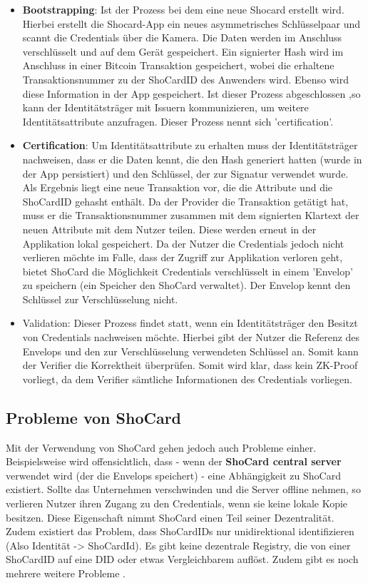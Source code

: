 \begin{itemize}
	\item \textbf{Bootstrapping}: Ist der Prozess bei dem eine neue Shocard erstellt wird. Hierbei erstellt die Shocard-App ein neues asymmetrisches Schlüsselpaar und scannt die Credentials über die Kamera. Die Daten werden im Anschluss verschlüsselt und auf dem Gerät gespeichert. Ein signierter Hash wird im Anschluss in einer Bitcoin Transaktion gespeichert, wobei die erhaltene Transaktionsnummer zu der ShoCardID des Anwenders wird. Ebenso wird diese Information in der App gespeichert. Ist dieser Prozess abgeschlossen ,so kann der Identitätsträger mit Issuern kommunizieren, um weitere Identitätsattribute anzufragen. Dieser Prozess nennt sich 'certification'.
	\item \textbf{Certification}: Um Identitätsattribute zu erhalten muss der Identitätsträger nachweisen, dass er die Daten kennt, die den Hash generiert hatten (wurde in der App persistiert) und den Schlüssel, der zur Signatur verwendet wurde. Als Ergebnis liegt eine neue Transaktion vor, die die Attribute und die ShoCardID gehasht enthält. Da der Provider die Transaktion getätigt hat, muss er die Transaktionsnummer zusammen mit dem signierten Klartext der neuen Attribute mit dem Nutzer teilen. Diese werden erneut in der Applikation lokal gespeichert. Da der Nutzer die Credentials jedoch nicht verlieren möchte im Falle, dass der Zugriff zur Applikation verloren geht, bietet ShoCard die Möglichkeit Credentials verschlüsselt in einem 'Envelop' zu speichern (ein Speicher den ShoCard verwaltet). Der Envelop kennt den Schlüssel zur Verschlüsselung nicht.
	\item Validation: Dieser Prozess findet statt, wenn ein Identitätsträger den Besitzt von Credentials nachweisen möchte. Hierbei gibt der Nutzer die Referenz des Envelops und den zur Verschlüsselung verwendeten Schlüssel an. Somit kann der Verifier die Korrektheit überprüfen. Somit wird klar, dass kein ZK-Proof vorliegt, da dem Verifier sämtliche Informationen des Credentials vorliegen.	
\end{itemize}

\subsection{Probleme von ShoCard}
\label{shocard}
Mit der Verwendung von ShoCard gehen jedoch auch Probleme einher. Beispielsweise wird offensichtlich, dass - wenn der \textbf{ShoCard central server} verwendet wird (der die Envelops speichert) - eine Abhängigkeit zu ShoCard existiert. Sollte das Unternehmen verschwinden und die Server offline nehmen, so verlieren Nutzer ihren Zugang zu den Credentials, wenn sie keine lokale Kopie besitzen. Diese Eigenschaft nimmt ShoCard einen Teil seiner Dezentralität. Zudem existiert das Problem, dass ShoCardIDs nur unidirektional identifizieren (Also Identität -> ShoCardId). Es gibt keine dezentrale Registry, die von einer ShoCardID auf eine DID oder etwas Vergleichbarem auflöst. Zudem gibt es noch mehrere weitere Probleme \cite{ID46}.

